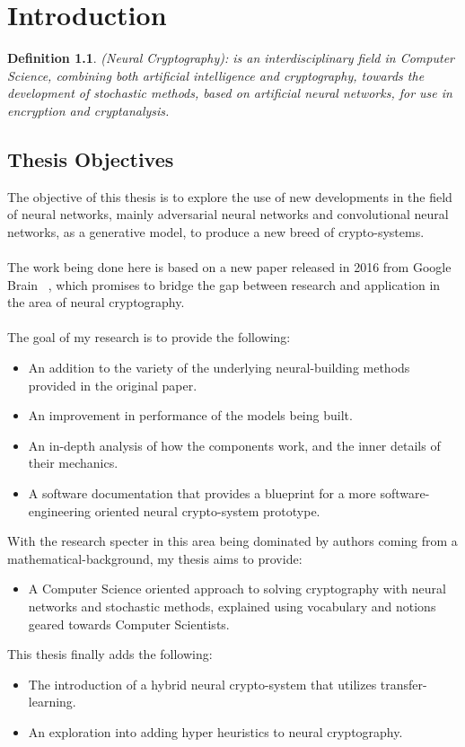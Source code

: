 \documentclass[a4paper, 12pt]{report}
\newtheorem{definition}{Definition}
\begin{document}
\chapter{Introduction}\label{sec:introduction}
\begin{definition}
	(Neural Cryptography): is an interdisciplinary field in Computer Science, combining both artificial intelligence and cryptography, towards the development of stochastic methods, based on artificial neural networks, for use in encryption and cryptanalysis.
\end{definition}
\section{\textbf{Thesis Objectives}}
The objective of this thesis is to explore the use of new developments in the field of neural networks, mainly adversarial neural networks and convolutional neural networks, as a generative model, to produce a new breed of crypto-systems.\\\\
The work being done here is based on a new paper released in 2016 from Google Brain ~\citep{DBLP:journals/corr/AbadiA16}, which promises to bridge the gap between research and application in the area of neural cryptography.\\\\
The goal of my research is to provide the following:
\begin{itemize}
	\item An addition to the variety of the underlying neural-building methods provided in the original paper.
	\item An improvement in performance of the models being built.
	\item An in-depth analysis of how the components work, and the inner details of their mechanics.
	\item A software documentation that provides a blueprint for a more software-engineering oriented neural crypto-system prototype.
\end{itemize}
With the research specter in this area being dominated by authors coming from a mathematical-background, my thesis aims to provide:
\begin{itemize}
	\item A Computer Science oriented approach to solving cryptography with neural networks and stochastic methods, explained using vocabulary and notions geared towards Computer Scientists.
\end{itemize}
This thesis finally adds the following:
\begin{itemize}
	\item The introduction of a hybrid neural crypto-system that utilizes transfer-learning.\citep{5288526}
	\item An exploration into adding hyper heuristics to neural cryptography.
\end{itemize}
\newpage
\end{document}
